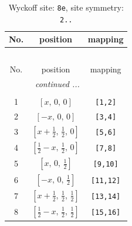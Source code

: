 \documentclass[fleqn,8pt]{jsarticle}
\begin{document}
\renewcommand{\arraystretch}{1.2}
\begin{longtable}{ccc}
\caption{Wyckoff site: {\tt 8e}, site symmetry: {\tt 2..}}
 \\
 \hline \hline
No. & position & mapping \\ \hline \endfirsthead

\multicolumn{2}{l}{\tablename\ \thetable{}} \\
 \hline \hline
No. & position & mapping \\ \hline \endhead

 \hline \hline
\multicolumn{2}{r}{\footnotesize\it continued ...} \\ \endfoot

 \hline \hline
\multicolumn{2}{r}{} \\ \endlastfoot

1 & $\left[ x,\, 0,\, 0 \right]$ & {\tt [1,2]} \\ \hline
2 & $\left[ - x,\, 0,\, 0 \right]$ & {\tt [3,4]} \\ \hline
3 & $\left[ x + \frac{1}{2},\, \frac{1}{2},\, 0 \right]$ & {\tt [5,6]} \\ \hline
4 & $\left[ \frac{1}{2} - x,\, \frac{1}{2},\, 0 \right]$ & {\tt [7,8]} \\ \hline
5 & $\left[ x,\, 0,\, \frac{1}{2} \right]$ & {\tt [9,10]} \\ \hline
6 & $\left[ - x,\, 0,\, \frac{1}{2} \right]$ & {\tt [11,12]} \\ \hline
7 & $\left[ x + \frac{1}{2},\, \frac{1}{2},\, \frac{1}{2} \right]$ & {\tt [13,14]} \\ \hline
8 & $\left[ \frac{1}{2} - x,\, \frac{1}{2},\, \frac{1}{2} \right]$ & {\tt [15,16]} \\
\end{longtable}
\renewcommand{\arraystretch}{1.2}
\end{document}
